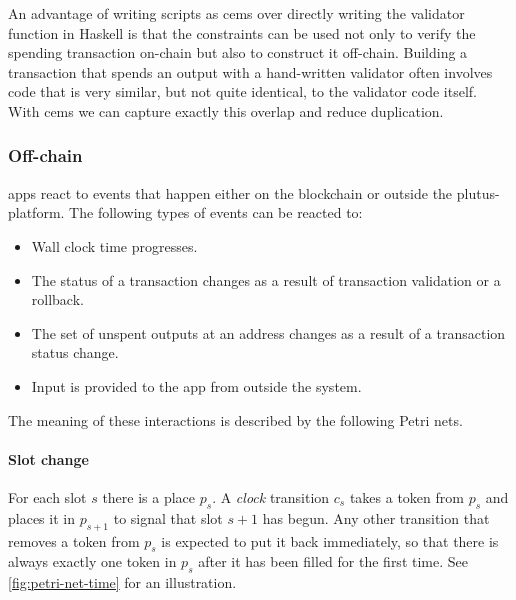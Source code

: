 An advantage of writing \glspl{script} as \glspl{cem} over directly writing the \gls{validator} function in Haskell is that the constraints can be used not only to verify the spending transaction on-chain but also to construct it off-chain.
Building a transaction that spends an output with a hand-written \gls{validator} often involves code that is very similar, but not quite identical, to the validator code itself.
With \glspl{cem} we can capture exactly this overlap and reduce duplication.

\subsubsection{Off-chain}

\glspl{app} react to events that happen either on the blockchain or outside the \gls{plutus-platform}.
The following types of events can be reacted to:
\begin{itemize}
  \item Wall clock time progresses.
  \item The status of a transaction changes as a result of transaction validation or a rollback.
  \item The set of unspent outputs at an address changes as a result of a transaction status change.
  \item Input is provided to the \gls{app} from outside the system.
\end{itemize}

The meaning of these interactions is described by the following Petri nets.

\paragraph{Slot change}

For each slot $s$ there is a place $p_s$.
A \emph{clock} transition $c_s$ takes a token from $p_s$ and places it in $p_{s+1}$ to signal that slot $s + 1$ has begun.
Any other transition that removes a token from $p_s$ is expected to put it back immediately, so that there is always exactly one token in $p_s$ after it has been filled for the first time. See \ref{fig:petri-net-time} for an illustration.

